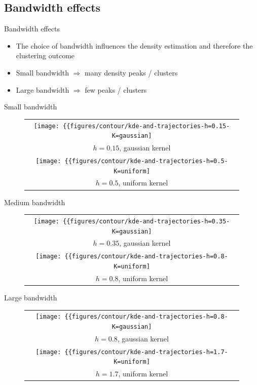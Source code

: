 \documentclass[18pt]{beamer}
\begin{document}
\subsection{Bandwidth effects}

\begin{frame}{Bandwidth effects}
	\begin{itemize}
		\item The choice of bandwidth influences the density estimation and therefore the clustering outcome
	\end{itemize}
	\begin{itemize}
		\item Small bandwidth $\Rightarrow$ many density peaks / clusters
		\item Large bandwidth $\Rightarrow$ few peaks / clusters
	\end{itemize}
\end{frame}
\begin{frame}{Small bandwidth}
\begin{figure}
	\tiny
	\begin{tabular}{c}
		\texttt{[image: \{\{figures/contour/kde-and-trajectories-h=0.15-K=gaussian]}}} \\[-2mm]
		$h=0.15$, gaussian kernel \\
		\texttt{[image: \{\{figures/contour/kde-and-trajectories-h=0.5-K=uniform]}}} \\[-2mm]
		$h=0.5$, uniform kernel
	\end{tabular}
\end{figure}
\end{frame}

\begin{frame}{Medium bandwidth}
\begin{figure}	
	\tiny
	\begin{tabular}{c}
		\texttt{[image: \{\{figures/contour/kde-and-trajectories-h=0.35-K=gaussian]}}} \\[-2mm]
		$h=0.35$, gaussian kernel \\
		\texttt{[image: \{\{figures/contour/kde-and-trajectories-h=0.8-K=uniform]}}} \\[-2mm]
		$h=0.8$, uniform kernel
	\end{tabular}
\end{figure}
\end{frame}

\begin{frame}{Large bandwidth}
\begin{figure}	
	\tiny
	\begin{tabular}{c}
		\texttt{[image: \{\{figures/contour/kde-and-trajectories-h=0.8-K=gaussian]}}} \\[-2mm]
		$h=0.8$, gaussian kernel \\
		\texttt{[image: \{\{figures/contour/kde-and-trajectories-h=1.7-K=uniform]}}} \\[-2mm]
		$h=1.7$, uniform kernel
	\end{tabular}
\end{figure}
\end{frame}
\end{document}
